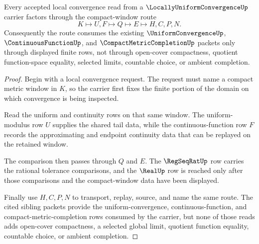 \begin{theorem}
\label{thm:locally-uniform-convergence-compact-route}
Every accepted local convergence read from a $\LocallyUniformConvergenceUp$ carrier factors through the compact-window route
$$
K \longmapsto U,F \longmapsto Q \longmapsto E \longmapsto H,C,P,N .
$$
Consequently the route consumes the existing $\UniformConvergenceUp$, $\ContinuousFunctionUp$, and $\CompactMetricCompletionUp$ packets only through displayed finite rows, not through open-cover compactness, quotient function-space equality, selected limits, countable choice, or ambient completion.
\end{theorem}
\begin{proof}
Begin with a local convergence request. The request must name a compact metric window in $K$, so the carrier first fixes the finite portion of the domain on which convergence is being inspected.

Read the uniform and continuity rows on that same window. The uniform-modulus row $U$ supplies the shared tail data, while the continuous-function row $F$ records the approximating and endpoint continuity data that can be replayed on the retained window.

The comparison then passes through $Q$ and $E$. The $\RegSeqRatUp$ row carries the rational tolerance comparisons, and the $\RealUp$ row is reached only after those comparisons and the compact-window data have been displayed.

Finally use $H,C,P,N$ to transport, replay, source, and name the same route. The cited sibling packets provide the uniform-convergence, continuous-function, and compact-metric-completion rows consumed by the carrier, but none of those reads adds open-cover compactness, a selected global limit, quotient function equality, countable choice, or ambient completion.
\end{proof}



